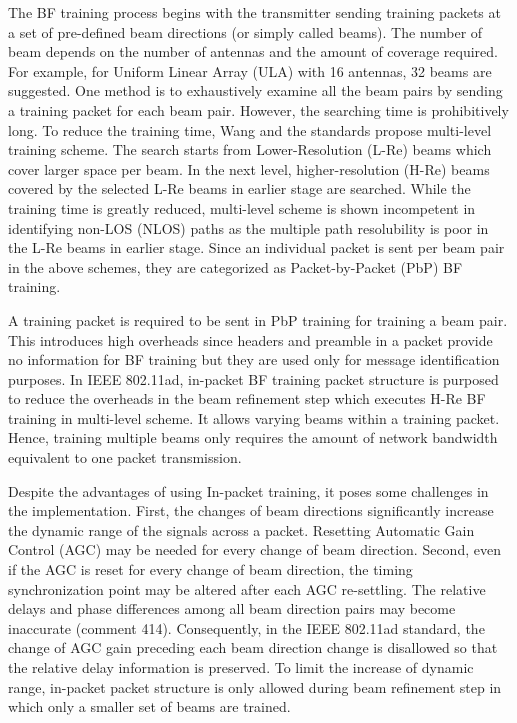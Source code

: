 \documentclass[10pt,conference]{IEEEtran}
\begin{document}
The BF training process begins with the transmitter sending training packets at a set of pre-defined beam directions (or simply called beams). The number of beam depends on the number of antennas and the amount of coverage \cite{maltsec10} required. For example, for Uniform Linear Array (ULA) with 16 antennas, 32 beams are suggested. One method is to exhaustively examine all the beam pairs \cite{Dai06efficientbroadcasting} by sending a training packet for each beam pair. However, the searching time is prohibitively long. To reduce the training time, Wang
\cite{Wang09} and the standards \cite{IEEE802153c}\cite{IEEE80211ad} propose multi-level training scheme. The search
starts from Lower-Resolution (L-Re) beams which cover larger space per beam.
In the next level, higher-resolution (H-Re) beams covered by the selected
L-Re beams in earlier stage are searched. While the training time is greatly reduced, multi-level scheme is shown incompetent in identifying non-LOS (NLOS) paths as the multiple path resolubility \cite{Tse05} is poor in the L-Re beams in earlier stage. Since an individual packet is sent per beam pair in the above schemes, they are categorized as Packet-by-Packet (PbP) BF training.

A training packet is required to be sent in PbP training for training a beam pair. This introduces high overheads since headers and preamble in a packet provide no information for BF training but they are used only for message identification purposes. In IEEE 802.11ad, in-packet BF training packet structure is purposed to reduce the overheads in the beam refinement step which executes H-Re BF training in multi-level scheme. It allows varying beams within a training packet. Hence, training multiple beams only requires the amount of network bandwidth equivalent to one packet transmission.

Despite the advantages of using In-packet training, it poses some challenges in the implementation. First, the changes of beam directions significantly increase the dynamic range of the signals across a packet. Resetting Automatic Gain Control (AGC) may be needed for every change of beam direction. Second, even if the AGC is reset for every change of beam direction, the timing synchronization point may be altered after each AGC re-settling. The relative delays and phase differences among all beam direction pairs may become inaccurate \cite{kasher10} (comment 414). Consequently, in the IEEE 802.11ad standard, the change of AGC gain preceding each beam direction change is disallowed so that the relative delay information is preserved. To limit the increase of dynamic range, in-packet packet structure is only allowed during beam refinement step in which only a smaller set of beams are trained.
\end{document}
